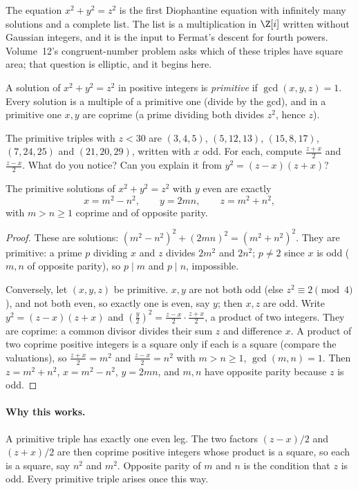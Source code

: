 The equation $x^2+y^2=z^2$ is the first Diophantine equation with infinitely many solutions and a complete list. The list is a multiplication in $\Z[i]$ written without Gaussian integers, and it is the input to Fermat's descent for fourth powers. Volume~12's congruent-number problem asks which of these triples have square area; that question is elliptic, and it begins here.

A solution of $x^2+y^2=z^2$ in positive integers is \emph{primitive} if $\gcd(x,y,z)=1$. Every solution is a multiple of a primitive one (divide by the gcd), and in a primitive one $x,y$ are coprime (a prime dividing both divides $z^2$, hence $z$).

\begin{think}
The primitive triples with $z<30$ are $(3,4,5)$, $(5,12,13)$, $(15,8,17)$, $(7,24,25)$ and $(21,20,29)$, written with $x$ odd. For each, compute $\frac{z+x}2$ and $\frac{z-x}2$. What do you notice? Can you explain it from $y^2=(z-x)(z+x)$?
\end{think}

\begin{theorem}\label{thm:pyth}
The primitive solutions of $x^2+y^2=z^2$ with $y$ even are exactly
\[
x=m^2-n^2,\qquad y=2mn,\qquad z=m^2+n^2,
\]
with $m>n\ge1$ coprime and of opposite parity.
\end{theorem}
\begin{proof}
These are solutions: $(m^2-n^2)^2+(2mn)^2=(m^2+n^2)^2$. They are primitive: a prime $p$ dividing $x$ and $z$ divides $2m^2$ and $2n^2$; $p\ne2$ since $x$ is odd ($m,n$ of opposite parity), so $p\mid m$ and $p\mid n$, impossible.

Conversely, let $(x,y,z)$ be primitive. $x,y$ are not both odd (else $z^2\equiv2\pmod4$), and not both even, so exactly one is even, say $y$; then $x,z$ are odd. Write $y^2=(z-x)(z+x)$ and $\left(\frac y2\right)^2=\frac{z-x}2\cdot\frac{z+x}2$, a product of two integers. They are coprime: a common divisor divides their sum $z$ and difference $x$. A product of two coprime positive integers is a square only if each is a square (compare the valuations), so $\frac{z+x}2=m^2$ and $\frac{z-x}2=n^2$ with $m>n\ge1$, $\gcd(m,n)=1$. Then $z=m^2+n^2$, $x=m^2-n^2$, $y=2mn$, and $m,n$ have opposite parity because $z$ is odd.
\end{proof}

\paragraph{Why this works.}
A primitive triple has exactly one even leg. The two factors $(z-x)/2$ and $(z+x)/2$ are then coprime positive integers whose product is a square, so each is a square, say $n^2$ and $m^2$. Opposite parity of $m$ and $n$ is the condition that $z$ is odd. Every primitive triple arises once this way.

